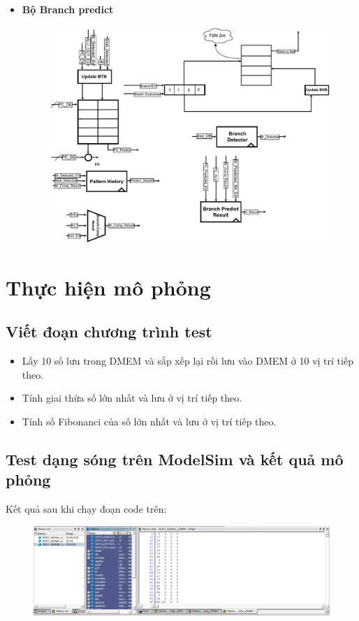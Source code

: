 \documentclass[E:/Latex/ExtraWork/ComputerArchitechture/Report.tex]{subfiles}
\begin{document}
\begin{otherlanguage}{english}
\begin{itemize}
\begin{itemize}
						\newpage
						\item \textbf {Bộ Branch predict}
						\begin{figure}[h!]
							\includegraphics[scale = 0.8]{Figure/Branch.pdf}
							\centering
						\end{figure}	
					\end{itemize}

					
					\section{Thực hiện mô phỏng}
					\subsection{Viết đoạn chương trình test}
						\begin{itemize}
							\item Lấy 10 số lưu trong DMEM và sắp xếp lại rồi lưu vào DMEM ở 10 vị trí tiếp theo.
							\item Tính giai thừa số lớn nhất và lưu ở vị trí tiếp theo.
							\item Tính số Fibonanci của số lớn nhất và lưu ở vị trí tiếp theo.
						\end{itemize}
					
					\newpage
					\subsection{Test dạng sóng trên ModelSim và kết quả mô phỏng}
					Kết quả sau khi chạy đoạn code trên: 
					\begin{figure}[h!]
						\includegraphics[scale = 0.5]{Figure/Fig6.png}
						\centering
					\end{figure}


\end{itemize}
\end{otherlanguage}
\end{document}
